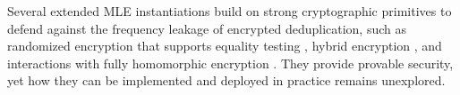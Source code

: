 \documentclass[bachelor]{thesis-uestc}
\begin{document}
Several extended MLE instantiations build on strong cryptographic primitives to defend against the frequency leakage of encrypted deduplication, such as randomized encryption that supports equality testing \cite{abadi13}, hybrid encryption \cite{stanek14}, and interactions with fully homomorphic encryption \cite{bellare15}. They provide provable security, yet how they can be implemented and deployed in practice remains unexplored. 

 





\end{document}
